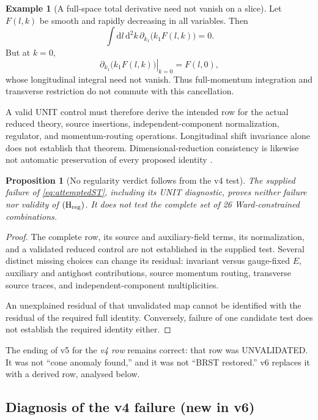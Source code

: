 \documentclass[11pt,a4paper]{article}
\newcommand{\dd}{\mathrm d}
\newcommand{\Hreg}{(\mathrm H_{\rm reg})}
\newcommand{\UNVALIDATED}{\textsf{UNVALIDATED}}
\theoremstyle{plain}
\newtheorem{proposition}[theorem]{Proposition}
\theoremstyle{definition}
\newtheorem{example}[theorem]{Example}
\theoremstyle{remark}
\numberwithin{equation}{section}
\begin{document}
\begin{example}[A full-space total derivative need not vanish on a slice]
\label{ex:slice}
Let \(F(l,k)\) be smooth and rapidly decreasing in all variables.
Then
\[
\int \dd l\,\dd^2k\,
 \partial_{k_1}\bigl(k_1F(l,k)\bigr)=0.
\]
But at \(k=0\),
\[
\left.
\partial_{k_1}\bigl(k_1F(l,k)\bigr)\right|_{k=0}
 =F(l,0),
\]
whose longitudinal integral need not vanish.
Thus full-momentum integration and transverse restriction do not
commute with this cancellation.
\end{example}

A valid UNIT control must therefore derive the intended row for
the actual reduced theory, source insertions, independent-component
normalization, regulator, and momentum-routing operations.
Longitudinal shift invariance alone does not establish that theorem.
Dimensional-reduction consistency is likewise not automatic
preservation of every proposed identity \cite{Stockinger}.

\begin{proposition}[No regularity verdict follows from the v4 test]
\label{prop:noSTverdict}
The supplied failure of \eqref{eq:attemptedST}, including its UNIT
diagnostic, proves neither failure nor validity of \(\Hreg\).
It does not test the complete set of 26 Ward-constrained combinations.
\end{proposition}

\begin{proof}
The complete row, its source and auxiliary-field terms, its
normalization, and a validated reduced control are not established
in the supplied test.
Several distinct missing choices can change its residual:
invariant versus gauge-fixed \(E\), auxiliary and antighost
contributions, source momentum routing, transverse source traces,
and independent-component multiplicities.

An unexplained residual of that unvalidated map cannot be identified
with the residual of the required full identity.
Conversely, failure of one candidate test does not establish
the required identity either.
\end{proof}

The ending of v5 for the \emph{v4 row} remains correct: that row
was \UNVALIDATED.
It was not ``cone anomaly found,'' and it was not ``BRST restored.''
v6 replaces it with a derived row, analysed below.

\subsection{Diagnosis of the v4 failure (new in v6)}
\label{sec:STdiag}
\end{document}
